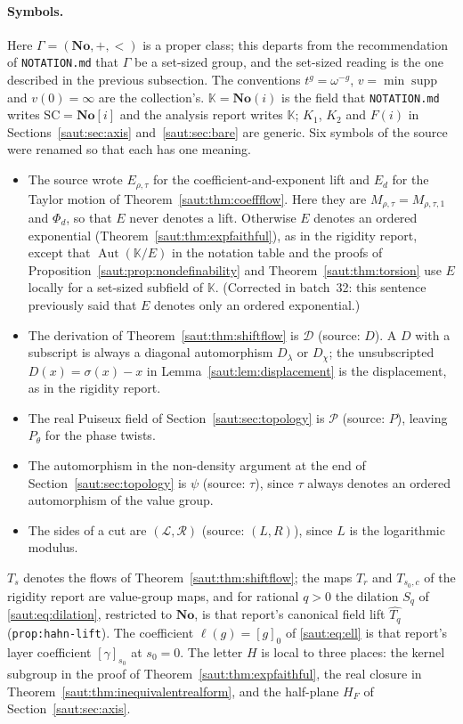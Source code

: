 \documentclass[11pt]{article}
\theoremstyle{definition}
\theoremstyle{remark}
\newcommand{\No}{\mathbf{No}}
\newcommand{\K}{\mathbb K}
\newcommand{\Aut}{\operatorname{Aut}}
\newcommand{\supp}{\operatorname{supp}}
\newcommand{\repo}[1]{\nolinkurl{#1}}%
\newcommand{\lbl}[1]{\nolinkurl{#1}}%
\numberwithin{equation}{section}
\begin{document}
\paragraph{Symbols.} Here $\Gamma=(\No,+,<)$ is a proper class; this
departs from the recommendation of \repo{NOTATION.md} that $\Gamma$ be a
set-sized group, and the set-sized reading is the one described in the
previous subsection. The conventions $t^g=\omega^{-g}$, $v=\min\supp$ and
$v(0)=\infty$ are the collection's. $\K=\No(i)$ is the field that
\repo{NOTATION.md} writes $\mathrm{SC}=\No[i]$ and the analysis report
writes $\K$; $K_1$, $K_2$ and $F(i)$ in Sections~\ref{saut:sec:axis}
and~\ref{saut:sec:bare} are generic. Six symbols of the source were
renamed so that each has one meaning.
\begin{itemize}
\item The source wrote $E_{\rho,\tau}$ for the coefficient-and-exponent lift
and $E_d$ for the Taylor motion of Theorem~\ref{saut:thm:coeffflow}. Here
they are $M_{\rho,\tau}=M_{\rho,\tau,1}$ and $\Phi_d$, so that $E$ never
denotes a lift. Otherwise $E$ denotes an ordered exponential
(Theorem~\ref{saut:thm:expfaithful}), as in the rigidity report, except
that $\Aut(\K/E)$ in the notation table and the proofs of
Proposition~\ref{saut:prop:nondefinability} and
Theorem~\ref{saut:thm:torsion} use $E$ locally for a set-sized subfield of
$\K$. (Corrected in batch~32: this sentence previously said that $E$
denotes only an ordered exponential.)
\item The derivation of Theorem~\ref{saut:thm:shiftflow} is $\mathcal D$
(source: $D$). A $D$ with a subscript is always a diagonal automorphism
$D_\lambda$ or $D_\chi$; the unsubscripted $D(x)=\sigma(x)-x$ in
Lemma~\ref{saut:lem:displacement} is the displacement, as in the rigidity
report.
\item The real Puiseux field of Section~\ref{saut:sec:topology} is
$\mathcal P$ (source: $P$), leaving $P_\theta$ for the phase twists.
\item The automorphism in the non-density argument at the end of
Section~\ref{saut:sec:topology} is $\psi$ (source: $\tau$), since $\tau$
always denotes an ordered automorphism of the value group.
\item The sides of a cut are $(\mathcal L,\mathcal R)$ (source: $(L,R)$),
since $L$ is the logarithmic modulus.
\end{itemize}
$T_s$ denotes the flows of Theorem~\ref{saut:thm:shiftflow}; the maps $T_r$
and $T_{s_0,c}$ of the rigidity report are value-group maps, and for
rational $q>0$ the dilation $S_q$ of \eqref{saut:eq:dilation}, restricted to
$\No$, is that report's canonical field lift $\widehat{T_q}$
(\lbl{prop:hahn-lift}). The coefficient $\ell(g)=[g]_0$ of
\eqref{saut:eq:ell} is that report's layer coefficient $[\gamma]_{s_0}$ at
$s_0=0$. The letter $H$ is local to three places: the kernel subgroup in
the proof of Theorem~\ref{saut:thm:expfaithful}, the real closure in
Theorem~\ref{saut:thm:inequivalentrealform}, and the half-plane $H_F$ of
Section~\ref{saut:sec:axis}.
\end{document}
